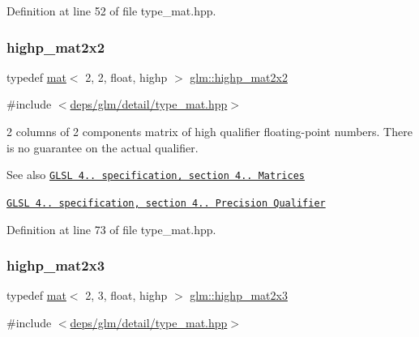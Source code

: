 Definition at line 52 of file type\+\_\+mat.\+hpp.

\mbox{\label{group__core__precision_gacdb012ddb9e783ed51b0ee009bf0d822}} 
\subsubsection{\texorpdfstring{highp\+\_\+mat2x2}{highp\_mat2x2}}
{\footnotesize\ttfamily typedef \hyperlink{structglm_1_1mat}{mat}$<$ 2, 2, float, highp $>$ \hyperlink{group__core__precision_gacdb012ddb9e783ed51b0ee009bf0d822}{glm\+::highp\+\_\+mat2x2}}



{\ttfamily \#include $<$\hyperlink{type__mat_8hpp}{deps/glm/detail/type\+\_\+mat.\+hpp}$>$}

2 columns of 2 components matrix of high qualifier floating-\/point numbers. There is no guarantee on the actual qualifier.

\begin{DoxySeeAlso}{See also}
\href{http://www.opengl.org/registry/doc/GLSLangSpec.4.20.8.pdf}{\tt G\+L\+SL 4.. specification, section 4.. Matrices} 

\href{http://www.opengl.org/registry/doc/GLSLangSpec.4.20.8.pdf}{\tt G\+L\+SL 4.. specification, section 4.. Precision Qualifier} 
\end{DoxySeeAlso}


Definition at line 73 of file type\+\_\+mat.\+hpp.

\mbox{\label{group__core__precision_ga9d61903aea75d6932829cd049f2e622a}} 
\subsubsection{\texorpdfstring{highp\+\_\+mat2x3}{highp\_mat2x3}}
{\footnotesize\ttfamily typedef \hyperlink{structglm_1_1mat}{mat}$<$ 2, 3, float, highp $>$ \hyperlink{group__core__precision_ga9d61903aea75d6932829cd049f2e622a}{glm\+::highp\+\_\+mat2x3}}



{\ttfamily \#include $<$\hyperlink{type__mat_8hpp}{deps/glm/detail/type\+\_\+mat.\+hpp}$>$}


